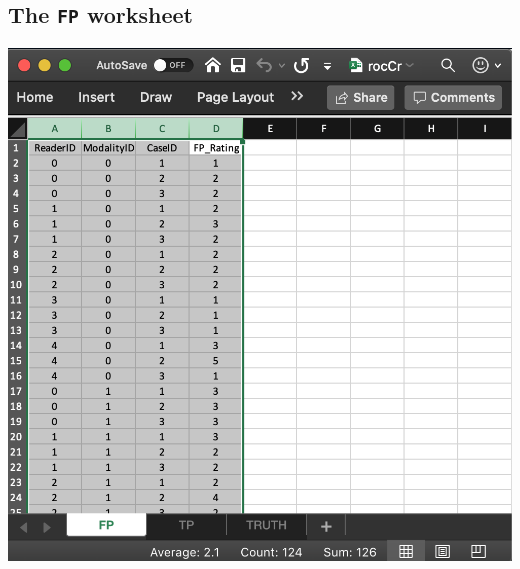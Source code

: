\documentclass[
]{book}
\begin{document}
\hypertarget{dataset-object-details-read-datafile-correspondence-nl-fp}{%
\subsection{\texorpdfstring{The \texttt{FP} worksheet}{The FP worksheet}}\label{dataset-object-details-read-datafile-correspondence-nl-fp}}

\includegraphics[width=1\textwidth,height=\textheight]{images/quick-start/rocCrFp.png}
\end{document}
